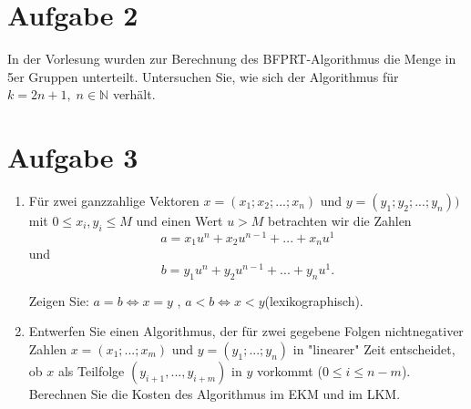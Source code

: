 \documentclass[11pt,a4paper,ngerman]{article}
\begin{document}
\section*{Aufgabe 2}

In der Vorlesung wurden zur Berechnung des BFPRT-Algorithmus die Menge in 5er Gruppen unterteilt. Untersuchen Sie, wie sich der Algorithmus für $k=2n+1,\; n \in \mathbb N $ verhält.



\section*{Aufgabe 3}

\begin{enumerate}[\bfseries (a)]

\item Für zwei ganzzahlige Vektoren $x=(x_1; x_2; ...; x_n)$ und $y=(y_1; y_2; ...; y_n))$ mit $0\leq x_i, y_i \leq M$ und einen Wert $u > M$ betrachten wir die Zahlen
$$
a = x_1 u^n + x_2 u^{n-1}+ ... + x_n u^1
$$
und
$$
b=y_1u^n + y_2 u^{n-1} + ... + y_n u^1.
$$

Zeigen Sie: $a=b \Leftrightarrow x=y$ , $a<b \Leftrightarrow x < y$(lexikographisch).


\item Entwerfen Sie einen Algorithmus, der für zwei gegebene Folgen nichtnegativer Zahlen $x=(x_1; ... ; x_m)$ und $y=(y_1; ...; y_n)$ in "linearer" Zeit entscheidet, ob $x$ als Teilfolge $(y_{i+1},...,y_{i+m})$ in $y$ vorkommt ($0 \leq i \leq n-m$). Berechnen Sie die Kosten des Algorithmus im EKM und im LKM.


\end{enumerate}
\label{LastPage}
\end{document}
